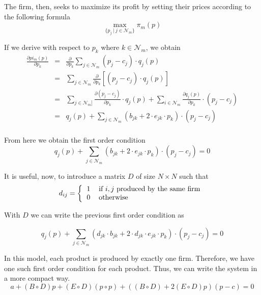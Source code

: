\documentclass[12pt]{article}
\begin{document}
The firm, then, seeks to maximize its profit by setting their prices according to the following formula
\begin{equation*}
\max_{\{p_j ~ | ~ j \in \mathcal{N}_m\}} \pi_m(p)
\end{equation*}

If we derive with respect to $p_k$ where $k \in \mathcal{N}_m$, we obtain
\begin{eqnarray*}
\frac{\partial pi_m(p)}{\partial p_k} &=& \frac{\partial}{\partial p_k} \sum_{j \in \mathcal{N}_m} (p_j - c_j) \cdot q_j(p)\\
&=& \sum_{j \in \mathcal{N}_m} \frac{\partial}{\partial	p_k} [(p_j - c_j) \cdot q_j(p)]\\
&=& \sum_{j \in \mathcal{N}_m]} \frac{\partial (p_j - c_j)}{\partial p_k} \cdot q_j(p) + \sum_{i \in \mathcal{N}_m} \frac{\partial q_j(p)}{\partial p_k} \cdot (p_j - c_j)\\
&=& q_j(p) + \sum_{j \in \mathcal{N}_m} (b_{jk} + 2 \cdot e_{jk} \cdot p_k) \cdot (p_j - c_j)\\
\end{eqnarray*}

From here we obtain the first order condition
\begin{equation*}
q_j(p) + \sum_{j \in \mathcal{N}_m} (b_{jk} + 2 \cdot e_{jk} \cdot p_k) \cdot (p_j - c_j) = 0
\end{equation*}

It is useful, now, to introduce a matrix $D$ of size $N \times N$ such that
\begin{equation*}
d_{ij} = \left\{
\begin{tabular}{ll}
1 & if $i,j$ produced by the same firm\\
0 & otherwise
\end{tabular}\right.
\end{equation*}

With $D$ we can write the previous first order condition as

\begin{equation*}
q_j(p) + \sum_{j \in \mathcal{N}_m} (d_{jk} \cdot b_{jk} + 2 \cdot d_{jk} \cdot e_{jk} \cdot p_k) \cdot (p_j - c_j) = 0
\end{equation*}

In this model, each product is produced by exactly one firm. Therefore, we have one such first order condition for each product. Thus, we can write the system in a more compact way.
\begin{equation*}
a +(B \circ D) p + (E \circ D) (p \circ p) + ((B \circ D) + 2 (E \circ D) p) (p - c) = 0 
\end{equation*}
\end{document}
